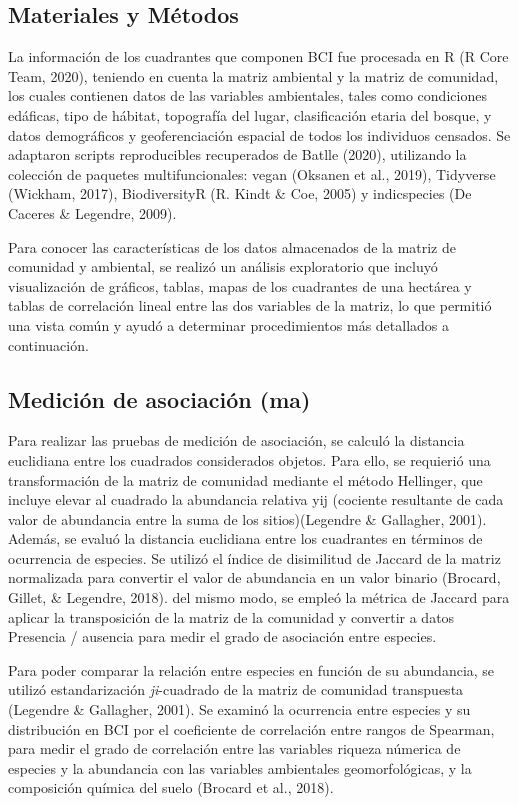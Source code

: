 \documentclass[11pt,]{article}
\begin{document}
\subsection{Materiales y Métodos}\label{materiales-y-muxe9todos}

La información de los cuadrantes que componen BCI fue procesada en R (R
Core Team, 2020), teniendo en cuenta la matriz ambiental y la matriz de
comunidad, los cuales contienen datos de las variables ambientales,
tales como condiciones edáficas, tipo de hábitat, topografía del lugar,
clasificación etaria del bosque, y datos demográficos y geoferenciación
espacial de todos los individuos censados. Se adaptaron scripts
reproducibles recuperados de Batlle (2020), utilizando la colección de
paquetes multifuncionales: vegan (Oksanen et al., 2019), Tidyverse
(Wickham, 2017), BiodiversityR (R. Kindt \& Coe, 2005) y indicspecies
(De Caceres \& Legendre, 2009).

Para conocer las características de los datos almacenados de la matriz
de comunidad y ambiental, se realizó un análisis exploratorio que
incluyó visualización de gráficos, tablas, mapas de los cuadrantes de
una hectárea y tablas de correlación lineal entre las dos variables de
la matriz, lo que permitió una vista común y ayudó a determinar
procedimientos más detallados a continuación.

\subsection{Medición de asociación
(ma)}\label{mediciuxf3n-de-asociaciuxf3n-ma}

Para realizar las pruebas de medición de asociación, se calculó la
distancia euclidiana entre los cuadrados considerados objetos. Para
ello, se requierió una transformación de la matriz de comunidad mediante
el método Hellinger, que incluye elevar al cuadrado la abundancia
relativa yij (cociente resultante de cada valor de abundancia entre la
suma de los sitios)(Legendre \& Gallagher, 2001). Además, se evaluó la
distancia euclidiana entre los cuadrantes en términos de ocurrencia de
especies. Se utilizó el índice de disimilitud de Jaccard de la matriz
normalizada para convertir el valor de abundancia en un valor binario
(Brocard, Gillet, \& Legendre, 2018). del mismo modo, se empleó la
métrica de Jaccard para aplicar la transposición de la matriz de la
comunidad y convertir a datos Presencia / ausencia para medir el grado
de asociación entre especies.

Para poder comparar la relación entre especies en función de su
abundancia, se utilizó estandarización \emph{ji}-cuadrado de la matriz
de comunidad transpuesta (Legendre \& Gallagher, 2001). Se examinó la
ocurrencia entre especies y su distribución en BCI por el coeficiente de
correlación entre rangos de Spearman, para medir el grado de correlación
entre las variables riqueza númerica de especies y la abundancia con las
variables ambientales geomorfológicas, y la composición química del
suelo (Brocard et al., 2018).
\end{document}

